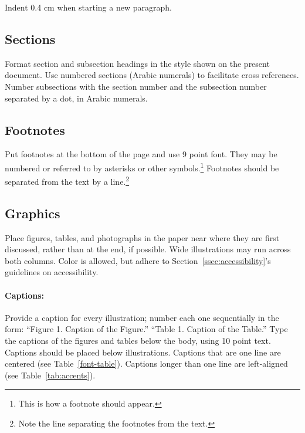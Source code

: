 \documentclass[11pt,a4paper]{article}
\begin{document}
Indent 0.4 cm when starting a new paragraph.

\subsection{Sections}

Format section and subsection headings in the style shown on the present document.
Use numbered sections (Arabic numerals) to facilitate cross references.
Number subsections with the section number and the subsection number separated by a dot, in Arabic numerals.

\subsection{Footnotes}
Put footnotes at the bottom of the page and use 9 point font.
They may be numbered or referred to by asterisks or other symbols.\footnote{This is how a footnote should appear.}
Footnotes should be separated from the text by a line.\footnote{Note the line separating the footnotes from the text.}

\subsection{Graphics}

Place figures, tables, and photographs in the paper near where they are first discussed, rather than at the end, if possible.
Wide illustrations may run across both columns.
Color is allowed, but adhere to Section~\ref{ssec:accessibility}'s guidelines on accessibility.

\paragraph{Captions:}
Provide a caption for every illustration; number each one sequentially in the form:
``Figure 1. Caption of the Figure.''
``Table 1. Caption of the Table.''
Type the captions of the figures and tables below the body, using 10 point text.
Captions should be placed below illustrations.
Captions that are one line are centered (see Table~\ref{font-table}).
Captions longer than one line are left-aligned (see Table~\ref{tab:accents}).
\end{document}
